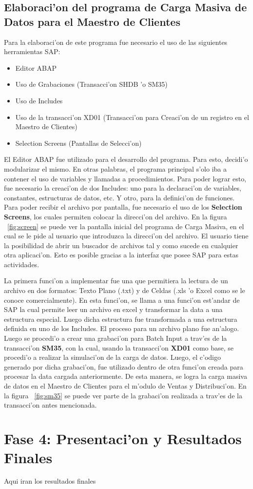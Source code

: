 \subsection{Elaboraci'on del programa de Carga Masiva de Datos para el Maestro de Clientes}
	Para la elaboraci'on de este programa fue necesario el uso de las siguientes herramientas SAP:
\begin{itemize}
\item Editor ABAP
\item Uso de Grabaciones (Transacci'on SHDB 'o SM35)
\item Uso de Includes
\item Uso de la transacci'on XD01 (Transacci'on para Creaci'on de un registro en el Maestro de Clientes)
\item Selection Screens (Pantallas de Selecci'on)
\end{itemize}
	El Editor ABAP fue utilizado para el desarrollo del programa. Para esto, decidi'o modularizar el mismo. En otras palabras, el programa principal s'olo iba a contener el uso de variables y llamadas a procedimientos. 
	Para poder lograr esto, fue necesario la creaci'on de dos Includes: uno para la declaraci'on de variables, constantes, estructuras de datos, etc. Y otro, para la definici'on de funciones.
	Para poder recibir el archivo por pantalla, fue necesario el uso de los \textbf{Selection Screens}, los cuales permiten colocar la direcci'on del archivo. En la figura ~\ref{fig:screen} se puede ver la pantalla inicial del programa de Carga Masiva, en el cual se le pide al usuario que introduzca la direcci'on del archivo. El usuario tiene la posibilidad de abrir un buscador de archivos tal y como sucede en cualquier otra aplicaci'on. Esto es posible gracias a la interfaz que posee SAP para estas actividades.

	La primera funci'on a implementar fue una que permitiera la lectura de un archivo en dos formatos: Texto Plano (.txt) y de Celdas (.xls 'o Excel como se le conoce comercialmente). En esta funci'on, se llama a una funci'on est'andar de SAP la cual permite leer un archivo en excel y transformar la data a una estructura especial. Luego dicha estructura fue transformada a una estructura definida en uno de los Includes. El proceso para un archivo plano fue an'alogo.
	Luego se procedi'o a crear una grabaci'on para Batch Input a trav'es de la transacci'on \textbf{SM35}, con la cual, usando la transacci'on \textbf{XD01} como base, se procedi'o a realizar la simulaci'on de la carga de datos. Luego, el c'odigo generado por dicha grabaci'on, fue utilizado dentro de otra funci'on creada para procesar la data cargada anteriormente. De esta manera, se logra la carga masiva de datos en el Maestro de Clientes para el m'odulo de Ventas y Distribuci'on. En la figura ~\ref{fig:sm35} se puede ver parte de la grabaci'on realizada a trav'es de la transacci'on antes mencionada.


\section{Fase 4: Presentaci'on y Resultados Finales}
Aqui iran los resultados finales